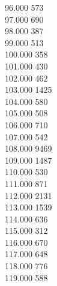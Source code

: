 { 96.000	573 \\
 97.000	690 \\
 98.000	387 \\
 99.000	513 \\
 100.000	358 \\
 101.000	430 \\
 102.000	462 \\
 103.000	1425 \\
 104.000	580 \\
 105.000	508 \\
 106.000	710 \\
 107.000	542 \\
 108.000	9469 \\
 109.000	1487 \\
 110.000	530 \\
 111.000	871 \\
 112.000	2131 \\
 113.000	1539 \\
 114.000	636 \\
 115.000	312 \\
 116.000	670 \\
 117.000	648 \\
 118.000	776 \\
 119.000	588 \\
}
